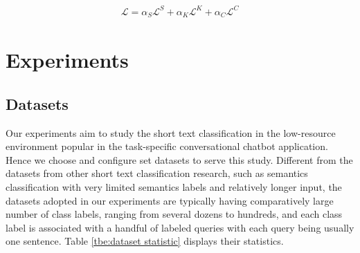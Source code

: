 \documentclass[letterpaper]{article} %
\begin{document}
  \begin{align}
    \mathcal{L} = \alpha_S \mathcal{L}^S + \alpha_K \mathcal{L}^K + \alpha_C \mathcal{L}^C
    \label{eq:joint_SFC_loss}
  \end{align}

  \section{Experiments}
  \label{sec:exp}

  \subsection{Datasets}
  Our experiments aim to study the short text classification in the low-resource
  environment  popular  in  the  task-specific conversational chatbot application.
  Hence we choose and configure set datasets to serve this study. Different from
  the  datasets from other short text classification research, such as semantics
  classification  with  very  limited  semantics labels and relatively longer
  input,   the   datasets  adopted  in  our  experiments  are  typically  having
  comparatively  large  number  of  class labels, ranging from several dozens to
  hundreds,  and  each  class  label  is  associated  with  a handful of labeled
  queries with each  query  being usually  one  sentence. Table \ref{tbe:dataset
  statistic} displays their statistics.
\end{document}
